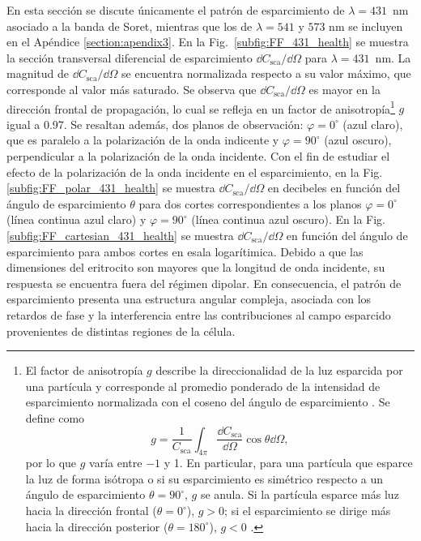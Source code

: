 En esta sección se discute únicamente el patrón de esparcimiento de $\lambda=431$~nm asociado a la banda de Soret, mientras que los de $\lambda=541$ y $573$ nm se incluyen en el Apéndice \ref{section:apendix3}. En la Fig.~\ref{subfig:FF_431_health} se muestra la sección transversal diferencial de esparcimiento $\dd{C_{\text{sca}}}/\dd{\Omega}$ para $\lambda=431$~nm. La magnitud de $\dd{C_{\text{sca}}}/\dd{\Omega}$ se encuentra normalizada respecto a su valor máximo, que corresponde al valor más saturado. Se observa que $\dd{C_{\text{sca}}}/\dd{\Omega}$ es mayor en la dirección frontal de propagación, lo cual se refleja en un factor de anisotropía\footnote{%
	El factor de anisotropía $g$ describe la direccionalidad de la luz esparcida por una partícula y corresponde al promedio ponderado de la intensidad de esparcimiento normalizada con el coseno del ángulo de esparcimiento \cite{videenAsymmetryParameterAggregate1998}. Se define como \cite{bohrenAbsorptionScatteringLight2008}
	$$g=\dfrac{1}{C_{\text{sca}}}\int_{4 \pi}\dfrac{\dd{C_{\text{sca}}}}{\dd{\Omega}}\cos\theta\dd{\Omega},$$
	por lo que $g$ varía entre $-1$ y 1. En particular, para una partícula que esparce la luz de forma isótropa o si su esparcimiento es simétrico respecto a un ángulo de esparcimiento $\theta=90^{\circ}$, $g$ se anula. Si la partícula esparce más luz hacia la dirección frontal ($\theta=0^{\circ}$), $g>0$; si el esparcimiento se dirige más hacia la dirección posterior ($\theta=180^{\circ}$), $g<0$ \cite{bohrenAbsorptionScatteringLight2008}.} %
$g$ igual a 0.97. Se resaltan además, dos planos de observación: $\varphi=0^{\circ}$ (azul claro), que es paralelo a la polarización de la onda indicente y $\varphi=90^{\circ}$ (azul oscuro), perpendicular a la polarización de la onda incidente. Con el fin de estudiar el efecto de la polarización de la onda incidente en el esparcimiento, en la Fig. \ref{subfig:FF_polar_431_health} se muestra $\dd{C_{\text{sca}}}/\dd{\Omega}$ en decibeles en función del ángulo de esparcimiento $\theta$ para dos cortes correspondientes a los planos $\varphi=0^{\circ}$ (línea continua azul claro) y $\varphi=90^{\circ}$ (línea continua azul oscuro). En la Fig. \ref{subfig:FF_cartesian_431_health} se muestra $\dd{C_{\text{sca}}}/\dd{\Omega}$ en función del ángulo de esparcimiento para ambos cortes en esala logarítimica. Debido a que las dimensiones del eritrocito son mayores que la longitud de onda incidente, su respuesta se encuentra fuera del régimen dipolar. En consecuencia, el patrón de esparcimiento presenta una estructura angular compleja, asociada con los retardos de fase y la interferencia entre las contribuciones al campo esparcido provenientes de distintas regiones de la célula.
